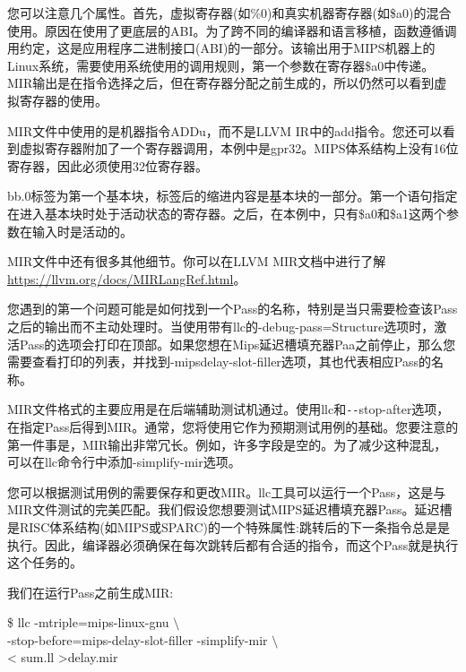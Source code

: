 您可以注意几个属性。首先，虚拟寄存器(如\%0)和真实机器寄存器(如\$a0)的混合使用。原因在使用了更底层的ABI。为了跨不同的编译器和语言移植，函数遵循调用约定，这是应用程序二进制接口(ABI)的一部分。该输出用于MIPS机器上的Linux系统，需要使用系统使用的调用规则，第一个参数在寄存器\$a0中传递。MIR输出是在指令选择之后，但在寄存器分配之前生成的，所以仍然可以看到虚拟寄存器的使用。\par

MIR文件中使用的是机器指令ADDu，而不是LLVM IR中的add指令。您还可以看到虚拟寄存器附加了一个寄存器调用，本例中是gpr32。MIPS体系结构上没有16位寄存器，因此必须使用32位寄存器。\par

bb.0标签为第一个基本块，标签后的缩进内容是基本块的一部分。第一个语句指定在进入基本块时处于活动状态的寄存器。之后，在本例中，只有\$a0和\$a1这两个参数在输入时是活动的。\par

MIR文件中还有很多其他细节。你可以在LLVM MIR文档中进行了解 \url{https://llvm.org/docs/MIRLangRef.html}。\par

您遇到的第一个问题可能是如何找到一个Pass的名称，特别是当只需要检查该Pass之后的输出而不主动处理时。当使用带有llc的-debug-pass=Structure选项时，激活Pass的选项会打印在顶部。如果您想在Mips延迟槽填充器Paa之前停止，那么您需要查看打印的列表，并找到-mipsdelay-slot-filler选项，其也代表相应Pass的名称。\par

MIR文件格式的主要应用是在后端辅助测试机通过。使用llc和\verb|--|stop-after选项，在指定Pass后得到MIR。通常，您将使用它作为预期测试用例的基础。您要注意的第一件事是，MIR输出非常冗长。例如，许多字段是空的。为了减少这种混乱，可以在llc命令行中添加-simplify-mir选项。\par

您可以根据测试用例的需要保存和更改MIR。llc工具可以运行一个Pass，这是与MIR文件测试的完美匹配。我们假设您想要测试MIPS延迟槽填充器Pass。延迟槽是RISC体系结构(如MIPS或SPARC)的一个特殊属性:跳转后的下一条指令总是是执行。因此，编译器必须确保在每次跳转后都有合适的指令，而这个Pass就是执行这个任务的。\par

我们在运行Pass之前生成MIR:\par

\begin{tcolorbox}[colback=white,colframe=black]
\$ llc -mtriple=mips-linux-gnu $\setminus$ \\
\hspace*{2cm}-stop-before=mips-delay-slot-filler -simplify-mir $\setminus$ \\
\hspace*{2cm}< sum.ll >delay.mir
\end{tcolorbox}

